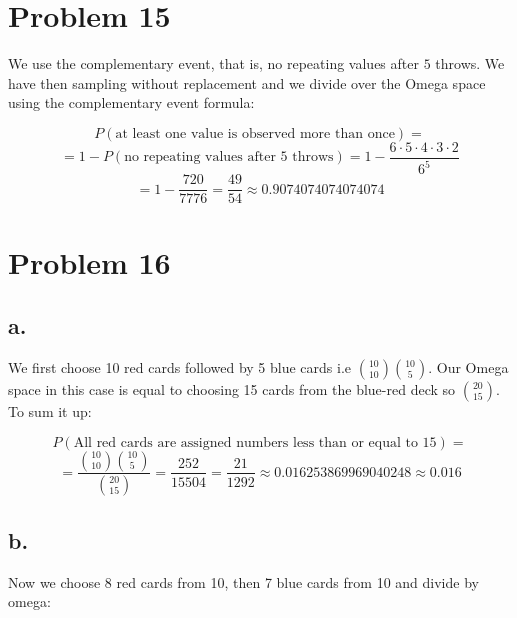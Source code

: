 \documentclass{article}
\begin{document}
\section*{Problem 15}

We use the complementary event, that is, no repeating values after \(5\) throws. We have then
sampling without replacement and we divide over the Omega space using the complementary event formula:

\begin{equation*}
    P(\mbox{at least one value is observed more than once}) =
\end{equation*}
\begin{equation*}
    = 1 - P(\mbox{no repeating values after \(5\) throws}) = 1 - \frac{6 \cdot 5 \cdot 4 \cdot 3 \cdot 2}{6^5}
\end{equation*}
\begin{equation*}
    = 1 - \frac{720}{7776} = \frac{49}{54} \approx 0.9074074074074074
\end{equation*}

\section*{Problem 16}

\subsection*{a.}

We first choose 10 red cards followed by 5 blue cards i.e \(\binom{10}{10}\binom{10}{5}\). Our Omega space in this case
is equal to choosing 15 cards from the blue-red deck so \(\binom{20}{15}\). To sum it up:

\begin{equation*}
    P(\mbox{All red cards are assigned numbers less than or equal to 15}) =
\end{equation*}
\begin{equation*}
    = \frac{\binom{10}{10}\binom{10}{5}}{\binom{20}{15}} = \frac{252}{15504} = \frac{21}{1292} \approx 0.016253869969040248 \approx 0.016
\end{equation*}

\subsection*{b.}

Now we choose 8 red cards from 10, then 7 blue cards from 10 and divide by omega:
\end{document}
